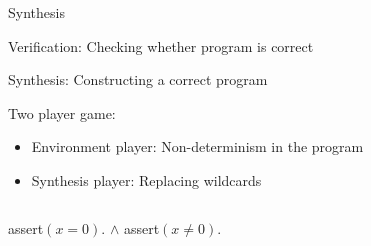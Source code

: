 \documentclass[../talk.tex]{subfiles}
\begin{document}
\begin{frame}{Synthesis}
    \begin{overlayarea}{\slidewidth}{\slideheight}
        {%
            \alert{Verification:} Checking whether program is correct
        }

        {%
            \alert{Synthesis:} Constructing a correct program 
        }

        \vspace*{1em}


        {%
            \alert{Two player game:}
            \begin{itemize}
                \item[] Environment player: Non-determinism in the program
                \item[] Synthesis player: Replacing wildcards
            \end{itemize}
        }

        \begin{center}
            \begin{columns}[T]
                \begin{column}{0.35\textwidth}
                    {%
                        \noindent

                        \vspace*{1em}

                        {%
                            assert$(x = 0)$. $\wedge$ assert$(x \neq 0)$.
                        }
                    }
                \end{column}
                \begin{column}{0.3\textwidth}
                    {%
                        \noindent

}
\end{column}
\end{columns}
\end{center}
\end{overlayarea}
\end{frame}
\end{document}
